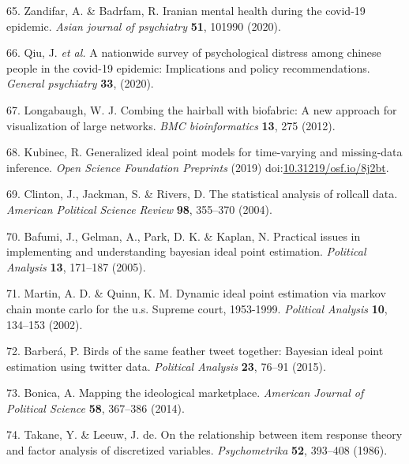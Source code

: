 \documentclass[]{article}
\begin{document}
\leavevmode\hypertarget{ref-zandifar2020iranian}{}%
65. Zandifar, A. \& Badrfam, R. Iranian mental health during the covid-19 epidemic. \emph{Asian journal of psychiatry} \textbf{51}, 101990 (2020).

\leavevmode\hypertarget{ref-qiu2020nationwide}{}%
66. Qiu, J. \emph{et al.} A nationwide survey of psychological distress among chinese people in the covid-19 epidemic: Implications and policy recommendations. \emph{General psychiatry} \textbf{33}, (2020).

\leavevmode\hypertarget{ref-longabaugh2012}{}%
67. Longabaugh, W. J. Combing the hairball with biofabric: A new approach for visualization of large networks. \emph{BMC bioinformatics} \textbf{13}, 275 (2012).

\leavevmode\hypertarget{ref-kubinec2019ideal}{}%
68. Kubinec, R. Generalized ideal point models for time-varying and missing-data inference. \emph{Open Science Foundation Preprints} (2019) doi:\href{https://doi.org/10.31219/osf.io/8j2bt}{10.31219/osf.io/8j2bt}.

\leavevmode\hypertarget{ref-jackman2004}{}%
69. Clinton, J., Jackman, S. \& Rivers, D. The statistical analysis of rollcall data. \emph{American Political Science Review} \textbf{98}, 355--370 (2004).

\leavevmode\hypertarget{ref-gelman2005}{}%
70. Bafumi, J., Gelman, A., Park, D. K. \& Kaplan, N. Practical issues in implementing and understanding bayesian ideal point estimation. \emph{Political Analysis} \textbf{13}, 171--187 (2005).

\leavevmode\hypertarget{ref-quinn2002}{}%
71. Martin, A. D. \& Quinn, K. M. Dynamic ideal point estimation via markov chain monte carlo for the u.s. Supreme court, 1953-1999. \emph{Political Analysis} \textbf{10}, 134--153 (2002).

\leavevmode\hypertarget{ref-barbera2015}{}%
72. Barberá, P. Birds of the same feather tweet together: Bayesian ideal point estimation using twitter data. \emph{Political Analysis} \textbf{23}, 76--91 (2015).

\leavevmode\hypertarget{ref-bonica2014}{}%
73. Bonica, A. Mapping the ideological marketplace. \emph{American Journal of Political Science} \textbf{58}, 367--386 (2014).

\leavevmode\hypertarget{ref-takane1986}{}%
74. Takane, Y. \& Leeuw, J. de. On the relationship between item response theory and factor analysis of discretized variables. \emph{Psychometrika} \textbf{52}, 393--408 (1986).
\end{document}
